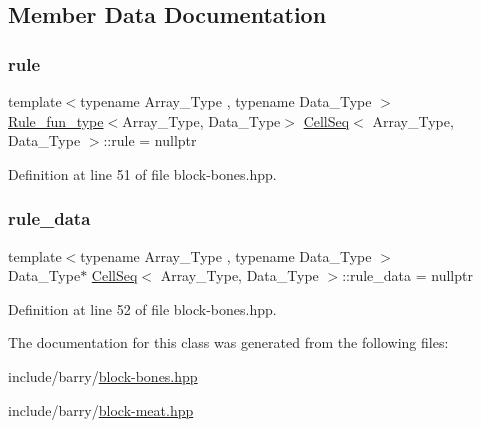 \subsection{Member Data Documentation}
\mbox{\label{class_cell_seq_a96562d860b3e66a90330854ff9184ba5}} 
\subsubsection{\texorpdfstring{rule}{rule}}
{\footnotesize\ttfamily template$<$typename Array\+\_\+\+Type , typename Data\+\_\+\+Type $>$ \\
\hyperlink{typedefs_8hpp_a2e147c9c0e8b65be614c98a5dd400d5c}{Rule\+\_\+fun\+\_\+type}$<$Array\+\_\+\+Type, Data\+\_\+\+Type$>$ \hyperlink{class_cell_seq}{Cell\+Seq}$<$ Array\+\_\+\+Type, Data\+\_\+\+Type $>$\+::rule = nullptr\hspace{0.3cm}{\ttfamily [protected]}}



Definition at line 51 of file block-\/bones.\+hpp.

\mbox{\label{class_cell_seq_a543981f0422f690a3c52da29f82d8e0e}} 
\subsubsection{\texorpdfstring{rule\+\_\+data}{rule\_data}}
{\footnotesize\ttfamily template$<$typename Array\+\_\+\+Type , typename Data\+\_\+\+Type $>$ \\
Data\+\_\+\+Type$\ast$ \hyperlink{class_cell_seq}{Cell\+Seq}$<$ Array\+\_\+\+Type, Data\+\_\+\+Type $>$\+::rule\+\_\+data = nullptr\hspace{0.3cm}{\ttfamily [protected]}}



Definition at line 52 of file block-\/bones.\+hpp.



The documentation for this class was generated from the following files\+:\begin{DoxyCompactItemize}
\item 
include/barry/\hyperlink{block-bones_8hpp}{block-\/bones.\+hpp}\item 
include/barry/\hyperlink{block-meat_8hpp}{block-\/meat.\+hpp}\end{DoxyCompactItemize}

